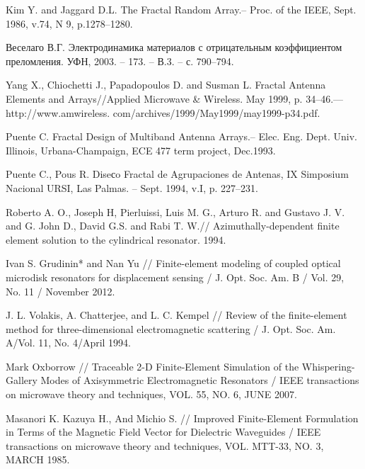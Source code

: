 \documentclass[%
specialist,  %
subf,        %
href,        %
colorlinks,  %
]{disser}
\begin{document}

\clearpage


%



\printbibliography[heading=bibintoc]
\begin{thebibliography}{99}	
  Kim Y. and Jaggard D.L. The Fractal Random Array.– Proc. of the IEEE, Sept. 1986, v.74, N 9, p.1278–1280.
	
 Веселаго В.Г. Электродинамика материалов с отрицательным коэффициентом преломления. УФН, 2003. – 173. – В.3. – с. 790–794. 
	
 Yang X., Chiochetti J., Papadopoulos D. and Susman L. Fractal Antenna Elements and Arrays//Applied Microwave & Wireless. May 1999, p. 34–46.— http://www.amwireless. com/archives/1999/May1999/may1999-p34.pdf. 
	
  Puente C. Fractal Design of Multiband Antenna Arrays.– Elec. Eng. Dept. Univ. Illinois, Urbana-Champaign, ECE 477 term project, Dec.1993.
	
 Puente C., Pous R. Diseсo Fractal de Agrupaciones de Antenas, IX Simposium Nacional URSI, Las Palmas. – Sept. 1994, v.I, p. 227–231.
	
 Roberto A. O., Joseph H, Pierluissi, Luis M. G., Arturo R. and Gustavo J. V. and G. John D., David G.S. and Rabi T. W.// Azimuthally-dependent finite element solution to the cylindrical resonator. 1994.
	
  Ivan S. Grudinin* and Nan Yu // Finite-element modeling of coupled optical microdisk resonators for displacement sensing / J. Opt. Soc. Am. B / Vol. 29, No. 11 / November 2012.
	
	
 J. L. Volakis, A. Chatterjee, and L. C. Kempel // Review of the finite-element method for three-dimensional electromagnetic scattering / J. Opt. Soc. Am. A/Vol. 11, No. 4/April 1994.
	
	
 Mark Oxborrow // Traceable 2-D Finite-Element Simulation of the Whispering-Gallery Modes of Axisymmetric Electromagnetic Resonators / IEEE transactions on microwave theory and techniques, VOL. 55, NO. 6, JUNE 2007.
	
	
 Masanori K. Kazuya H., And Michio S. // Improved Finite-Element Formulation in Terms of the Magnetic Field Vector for Dielectric Waveguides / IEEE transactions on microwave theory and techniques, VOL. MTT-33, NO. 3, MARCH 1985.


\end{thebibliography}
\end{document}
